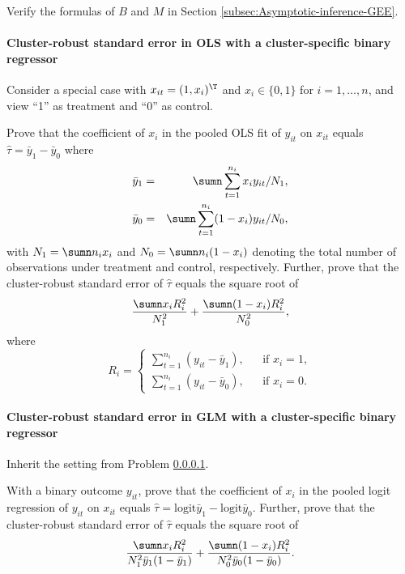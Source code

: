 Verify the formulas of $B$ and $M$ in Section \ref{subsec:Asymptotic-inference-GEE}. 


\paragraph{Cluster-robust standard error in OLS with a cluster-specific binary regressor}\label{hw21::crse-binary-x}

Consider a special case with $x_{it} = (1,x_i)^{\T}$ and $x_i \in \{0,1\}$ for $i=1,\ldots, n$, and view ``1'' as treatment and ``0'' as control. 

Prove  that the coefficient of $x_i$ in the pooled OLS fit of $y_{it}$ on $x_{it} $ equals $ \hat{\tau} =  \bar{y}_1 - \bar{y}_0$ where
\begin{eqnarray*}
\bar{y}_1 &=& \sumn \sum_{t=1}^{n_i} x_{i} y_{it} / N_1,\\ 
\bar{y}_0 &=& \sumn \sum_{t=1}^{n_i} (1-x_{i}) y_{it}/N_0,
\end{eqnarray*}
with $N_1 = \sumn  n_i x_{i}$ and $N_0 = \sumn  n_i (1-x_{i})$ denoting the total number of observations under treatment and control, respectively. Further, prove that the cluster-robust standard error of $ \hat{\tau}$ equals the square root of
$$
\frac{  \sumn x_i R_i^2 }{  N_1^2 }  
+  \frac{  \sumn (1-x_i) R_i^2 }{  N_0^2 } ,
$$
where 
$$
R_i = \left\{
\begin{array}{ccc}
 \sum_{t=1}^{n_i} (y_{it} - \bar{y}_1) , &&\text{if } x_i=1,\\
  \sum_{t=1}^{n_i} (y_{it} - \bar{y}_0) , &&\text{if } x_i=0. 
\end{array}
\right. 
$$


\paragraph{Cluster-robust standard error in GLM with a cluster-specific binary regressor}\label{hw21::crse-binary-x-GLM}

Inherit the setting from Problem \ref{hw21::crse-binary-x}. 

With a binary outcome $y_{it}$, prove that the coefficient of $x_i$ in the pooled logit regression of $y_{it}$ on $x_{it} $ equals $ \hat{\tau} =  \text{logit}\bar{y}_1 - \text{logit} \bar{y}_0$. Further, prove that the cluster-robust standard error of $ \hat{\tau}$ equals the square root of
$$
\frac{  \sumn x_i R_i^2 }{  N_1^2 \bar{y}_1(1-\bar{y}_1) }   
+ \frac{  \sumn (1-x_i) R_i^2 }{ N_0^2 \bar{y}_0 (1-\bar{y}_0) } . 
$$


